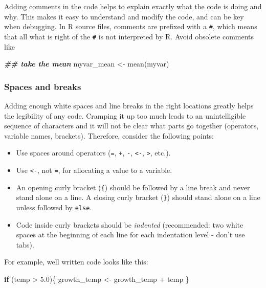 \documentclass[
]{book}
\newenvironment{Shaded}{\begin{snugshade}}{\end{snugshade}}
\newcommand{\ControlFlowTok}[1]{\textcolor[rgb]{0.13,0.29,0.53}{\textbf{#1}}}
\newcommand{\DocumentationTok}[1]{\textcolor[rgb]{0.56,0.35,0.01}{\textbf{\textit{#1}}}}
\newcommand{\FloatTok}[1]{\textcolor[rgb]{0.00,0.00,0.81}{#1}}
\newcommand{\FunctionTok}[1]{\textcolor[rgb]{0.00,0.00,0.00}{#1}}
\newcommand{\NormalTok}[1]{#1}
\newcommand{\OtherTok}[1]{\textcolor[rgb]{0.56,0.35,0.01}{#1}}
\newcommand{\SpecialCharTok}[1]{\textcolor[rgb]{0.00,0.00,0.00}{#1}}
\providecommand{\tightlist}{%
  \setlength{\itemsep}{0pt}\setlength{\parskip}{0pt}}
\begin{document}
Adding comments in the code helps to explain exactly what the code is doing and why. This makes it easy to understand and modify the code, and can be key when debugging. In R source files, comments are prefixed with a \texttt{\#}, which means that all what is right of the \texttt{\#} is not interpreted by R. Avoid obsolete comments like

\begin{Shaded}
\begin{Highlighting}[]
\DocumentationTok{\#\# take the mean }
\NormalTok{myvar\_mean }\OtherTok{\textless{}{-}} \FunctionTok{mean}\NormalTok{(myvar)}
\end{Highlighting}
\end{Shaded}

\hypertarget{spaces-and-breaks}{%
\subsubsection{Spaces and breaks}\label{spaces-and-breaks}}

Adding enough white spaces and line breaks in the right locations greatly helps the legibility of any code. Cramping it up too much leads to an unintelligible sequence of characters and it will not be clear what parts go together (operators, variable names, brackets). Therefore, consider the following points:

\begin{itemize}
\tightlist
\item
  Use spaces around operators (\texttt{=}, \texttt{+}, \texttt{-}, \texttt{\textless{}-}, \texttt{\textgreater{}}, etc.).
\item
  Use \texttt{\textless{}-}, not \texttt{=}, for allocating a value to a variable.
\item
  An opening curly bracket (\texttt{\{}) should be followed by a line break and never stand alone on a line. A closing curly bracket (\texttt{\}}) should stand alone on a line unless followed by \texttt{else}.
\item
  Code inside curly brackets should be \emph{indented} (recommended: two white spaces at the beginning of each line for each indentation level - don't use tabs).
\end{itemize}

For example, well written code looks like this:

\begin{Shaded}
\begin{Highlighting}[]
\ControlFlowTok{if}\NormalTok{ (temp }\SpecialCharTok{\textgreater{}} \FloatTok{5.0}\NormalTok{)\{}
\NormalTok{  growth\_temp }\OtherTok{\textless{}{-}}\NormalTok{ growth\_temp }\SpecialCharTok{+}\NormalTok{ temp  }
\NormalTok{\}}
\end{Highlighting}
\end{Shaded}
\end{document}
